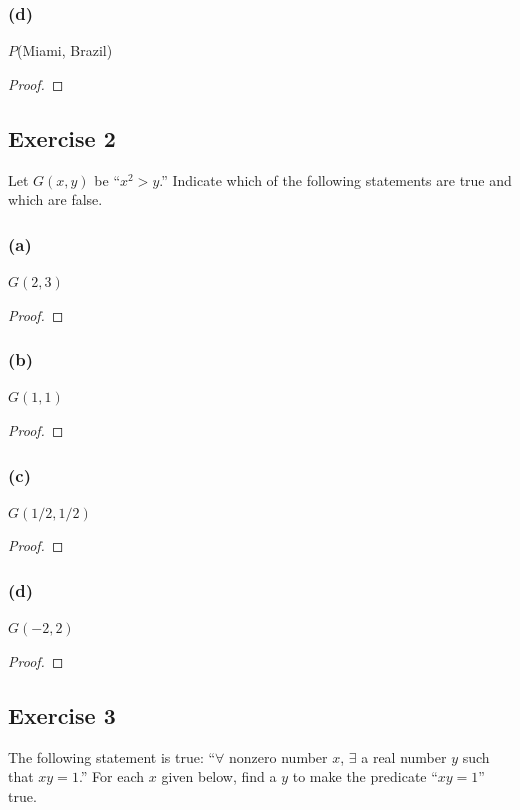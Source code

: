 \documentclass[14pt]{extarticle}
\newcommand{\fa}{\forall}
\newcommand{\te}{\exists}
\begin{document}
\subsubsection{(d)}
$P$(Miami, Brazil)

\begin{proof}

\end{proof}

\subsection{Exercise 2}
Let $G(x, y)$ be “$x^2 > y$.” Indicate which of the following statements are true and which are false.

\subsubsection{(a)}
$G(2, 3)$

\begin{proof}

\end{proof}

\subsubsection{(b)}
$G(1, 1)$

\begin{proof}

\end{proof}

\subsubsection{(c)}
$G(1/2, 1/2)$

\begin{proof}

\end{proof}

\subsubsection{(d)}
$G(-2, 2)$

\begin{proof}

\end{proof}

\subsection{Exercise 3}
The following statement is true: “$\fa$ nonzero number $x$, $\te$ a real number $y$ such that $xy = 1$.” For each $x$ given below, find a $y$ to make the predicate “$xy = 1$” true.
\end{document}
